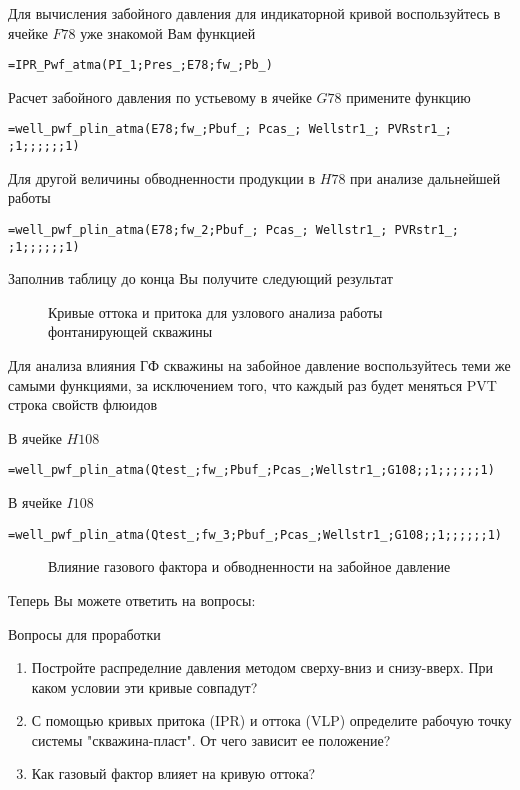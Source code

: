 Для вычисления забойного давления для индикаторной кривой воспользуйтесь в ячейке $F78$ уже знакомой Вам функцией

{ \small  \texttt{=IPR\_Pwf\_atma(PI\_1;Pres\_;E78;fw\_;Pb\_)}}

Расчет забойного давления по устьевому в ячейке $G78$ примените функцию
 
{ \small  \texttt{=well\_pwf\_plin\_atma(E78;fw\_;Pbuf\_; Pcas\_; Wellstr1\_; PVRstr1\_; ;1;;;;;;1)}} 

Для другой величины обводненности продукции в $H78$ при анализе дальнейшей работы

{ \small  \texttt{=well\_pwf\_plin\_atma(E78;fw\_2;Pbuf\_; Pcas\_; Wellstr1\_; PVRstr1\_; ;1;;;;;;1)}} 

Заполнив таблицу до конца Вы получите следующий результат

\begin{figure}[h!]
	\center{\texttt{[image: Ex90\_3]}}
	\caption{Кривые оттока и притока для узлового анализа работы фонтанирующей скважины}
	\label{ris:Ex90_3}
\end{figure}

Для анализа влияния ГФ скважины на забойное давление воспользуйтесь теми же самыми функциями, за исключением того, что каждый раз будет меняться PVT строка свойств флюидов

В ячейке $H108$ 

{ \small  \texttt{=well\_pwf\_plin\_atma(Qtest\_;fw\_;Pbuf\_;Pcas\_;Wellstr1\_;G108;;1;;;;;;1)}}

В ячейке $I108$ 

{ \small  \texttt{=well\_pwf\_plin\_atma(Qtest\_;fw\_3;Pbuf\_;Pcas\_;Wellstr1\_;G108;;1;;;;;;1)}}

\begin{figure}[h!]
	\center{\texttt{[image: Ex90\_4]}}
	\caption{Влияние газового фактора и обводненности на забойное давление}
	\label{ris:Ex90_4}
\end{figure}

Теперь Вы можете ответить на вопросы:

Вопросы для проработки

\begin{enumerate}
	\item Постройте распределние давления методом сверху-вниз и снизу-вверх. При каком условии эти кривые совпадут?
	\item С помощью кривых притока  (IPR) и оттока (VLP) определите рабочую точку системы "скважина-пласт". От чего зависит ее положение?
	\item Как газовый фактор влияет на кривую оттока?
\end{enumerate}

